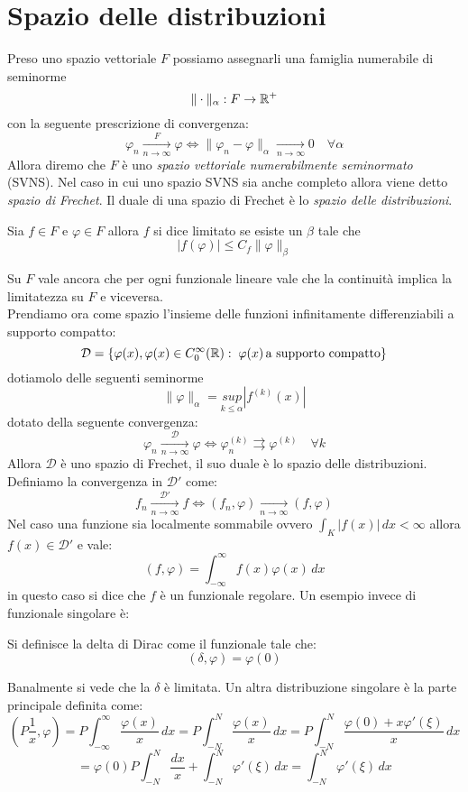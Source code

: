 \section{Spazio delle distribuzioni}
Preso uno spazio vettoriale $F$ possiamo assegnarli una famiglia numerabile di seminorme
\[\|\cdot\|_\alpha:F\to \mathbb{R}^+\]
con la seguente prescrizione di convergenza:
\[\varphi_n \xrightarrow[n\to \infty]{F} \varphi \iff \|\varphi_n-\varphi\|_\alpha \xrightarrow[n\to \infty]{} 0 \quad \forall\alpha\]
Allora diremo che $F$ è uno \emph{spazio vettoriale numerabilmente seminormato} (SVNS). Nel caso in cui uno spazio SVNS sia anche completo allora viene detto \emph{spazio di Frechet}. Il duale di una spazio di Frechet è lo \emph{spazio delle distribuzioni}. 
\begin{dfn}
Sia $f\in F$ e $\varphi\in F$ allora $f$ si dice limitato se esiste un $\beta$ tale che
\[|f(\varphi)|\leq C_f \|\varphi\|_\beta\]
\end{dfn}
Su $F$ vale ancora che per ogni funzionale lineare vale che la continuità implica la limitatezza su $F$ e viceversa.\\
Prendiamo ora come spazio l'insieme delle funzioni infinitamente differenziabili a supporto compatto:
\[\mathcal{D} = \{\varphi(x),\varphi(x)\in C_0^\infty(\mathbb{R}) : \;\varphi(x)\,\text{a supporto compatto} \}\]
dotiamolo delle seguenti seminorme
\[\|\varphi\|_\alpha = \underset{k\leq\alpha}{sup}|f^{(k)}(x)|\]
dotato della seguente convergenza:
\[\varphi_n \xrightarrow[n\to \infty]{\mathcal{D}} \varphi \iff \varphi_n^{(k)}  \rightrightarrows \varphi^{(k)}\quad \forall k\]
Allora $\mathcal{D}$ è uno spazio di Frechet, il suo duale è lo spazio delle distribuzioni.
Definiamo la convergenza in $\mathcal{D}'$ come:
\[f_n \xrightarrow[n\to \infty]{\mathcal{D}'} f \iff (f_n,\varphi) \xrightarrow[n\to \infty]{} (f,\varphi)\]
Nel caso una funzione sia localmente sommabile ovvero $\int_K |f(x)|\,dx<\infty$ allora $f(x)\in\mathcal{D}'$ e vale:
\[(f,\varphi) = \int_{-\infty}^\infty f(x)\varphi(x)\,dx\]
in questo caso si dice che $f$ è un funzionale regolare. Un esempio invece di funzionale singolare è:
\begin{dfn}
Si definisce la delta di Dirac come il funzionale tale che:
\[(\delta,\varphi) = \varphi(0)\]
\end{dfn}
Banalmente si vede che la $\delta$ è limitata. Un altra distribuzione singolare è la parte principale definita come:
\[\left(P\frac{1}{x},\varphi\right) = P\int_{-\infty}^\infty \frac{\varphi(x)}{x}\, dx = P\int_{-N}^N \frac{\varphi(x)}{x}\, dx = P\int_{-N}^N \frac{\varphi(0)+x\varphi'(\xi)}{x}\, dx \]\[ =\varphi(0)P\int_{-N}^N \frac{dx}{x} + \int_{-N}^N \varphi'(\xi) \,dx  =  \int_{-N}^N \varphi'(\xi) \,dx\]
